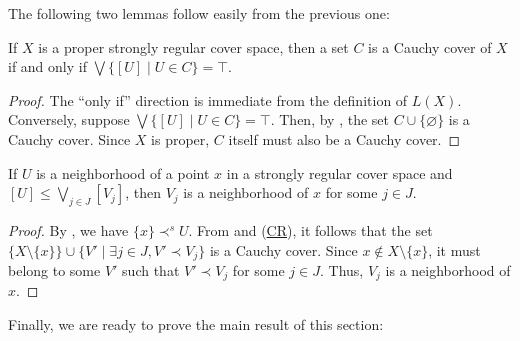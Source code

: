 \documentclass[pdflatex,sn-mathphys-num]{sn-jnl}
\newcommand{\axref}[1]{(\hyperref[ax:#1]{#1})}
\theoremstyle{definition}
\theoremstyle{remark}
\numberwithin{figure}{section}
\newcommand{\rb}{\prec}
\begin{document}
The following two lemmas follow easily from the previous one:

\begin{lem}
If $X$ is a proper strongly regular cover space, then a set $C$ is a Cauchy cover of $X$ if and only if $\bigvee \{ [U] \mid U \in C \} = \top$.
\end{lem}
\begin{proof}
The ``only if'' direction is immediate from the definition of $L(X)$.
Conversely, suppose $\bigvee \{ [U] \mid U \in C \} = \top$.
Then, by , the set $C \cup \{ \varnothing \}$ is a Cauchy cover.
Since $X$ is proper, $C$ itself must also be a Cauchy cover.
\end{proof}

\begin{lem}
If $U$ is a neighborhood of a point $x$ in a strongly regular cover space and $[U] \leq \bigvee_{j \in J} [V_j]$, then $V_j$ is a neighborhood of $x$ for some $j \in J$.
\end{lem}
\begin{proof}
By , we have $\{ x \} \rb^s U$.
From  and \axref{CR}, it follows that the set $\{ X \setminus \{ x \} \} \cup \{ V' \mid \exists j \in J, V' \rb V_j \}$ is a Cauchy cover.
Since $x \notin X \setminus \{ x \}$, it must belong to some $V'$ such that $V' \rb V_j$ for some $j \in J$.
Thus, $V_j$ is a neighborhood of $x$.
\end{proof}

Finally, we are ready to prove the main result of this section:
\end{document}
